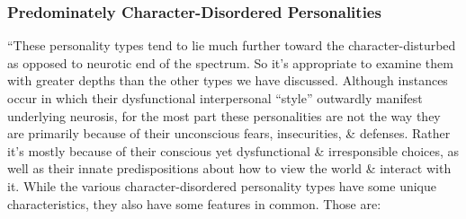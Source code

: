 \documentclass{article}
\numberwithin{equation}{section}
\begin{document}
\subsubsection{Predominately Character-Disordered Personalities}
``These personality types tend to lie much further toward the character-disturbed as opposed to neurotic end of the spectrum. So it's appropriate to examine them with greater depths than the other types we have discussed. Although instances occur in which their dysfunctional interpersonal ``style'' outwardly manifest underlying neurosis, for the most part these personalities are not the way they are primarily because of their unconscious fears, insecurities, \& defenses. Rather it's mostly because of their conscious yet dysfunctional \& irresponsible choices, as well as their innate predispositions about how to view the world \& interact with it. While the various character-disordered personality types have some unique characteristics, they also have some features in common. Those are:
\end{document}
